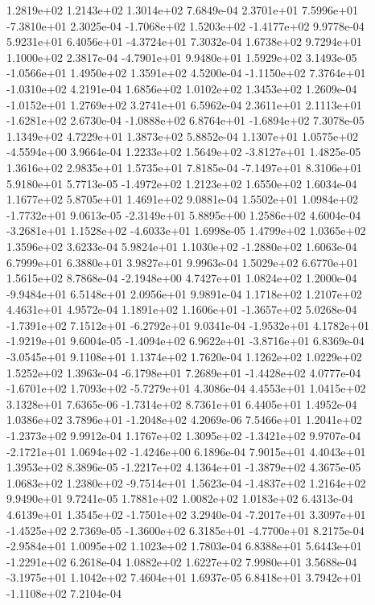1.2819e+02 1.2143e+02 1.3014e+02  7.6849e-04
 2.3701e+01  7.5996e+01 -7.3810e+01  2.3025e-04
-1.7068e+02  1.5203e+02 -1.4177e+02  9.9778e-04
 5.9231e+01  6.4056e+01 -4.3724e+01  7.3032e-04
1.6738e+02 9.7294e+01 1.1000e+02  2.3817e-04
-4.7901e+01  9.9480e+01  1.5929e+02  3.1493e-05
-1.0566e+01  1.4950e+02  1.3591e+02  4.5200e-04
-1.1150e+02  7.3764e+01 -1.0310e+02  4.2191e-04
1.6856e+02 1.0102e+02 1.3453e+02  1.2609e-04
-1.0152e+01  1.2769e+02  3.2741e+01  6.5962e-04
 2.3611e+01  2.1113e+01 -1.6281e+02  2.6730e-04
-1.0888e+02  6.8764e+01 -1.6894e+02  7.3078e-05
1.1349e+02 4.7229e+01 1.3873e+02  5.8852e-04
 1.1307e+01  1.0575e+02 -4.5594e+00  3.9664e-04
 1.2233e+02  1.5649e+02 -3.8127e+01  1.4825e-05
1.3616e+02 2.9835e+01 1.5735e+01  7.8185e-04
-7.1497e+01  8.3106e+01  5.9180e+01  5.7713e-05
-1.4972e+02  1.2123e+02  1.6550e+02  1.6034e-04
1.1677e+02 5.8705e+01 1.4691e+02  9.0881e-04
 1.5502e+01  1.0984e+02 -1.7732e+01  9.0613e-05
-2.3149e+01  5.8895e+00  1.2586e+02  4.6004e-04
-3.2681e+01  1.1528e+02 -4.6033e+01  1.6998e-05
1.4799e+02 1.0365e+02 1.3596e+02  3.6233e-04
 5.9824e+01  1.1030e+02 -1.2880e+02  1.6063e-04
6.7999e+01 6.3880e+01 3.9827e+01  9.9963e-04
1.5029e+02 6.6770e+01 1.5615e+02  8.7868e-04
-2.1948e+00  4.7427e+01  1.0824e+02  1.2000e-04
-9.9484e+01  6.5148e+01  2.0956e+01  9.9891e-04
1.1718e+02 1.2107e+02 4.4631e+01  4.9572e-04
 1.1891e+02  1.1606e+01 -1.3657e+02  5.0268e-04
-1.7391e+02  7.1512e+01 -6.2792e+01  9.0341e-04
-1.9532e+01  4.1782e+01 -1.9219e+01  9.6004e-05
-1.4094e+02  6.9622e+01 -3.8716e+01  6.8369e-04
-3.0545e+01  9.1108e+01  1.1374e+02  1.7620e-04
1.1262e+02 1.0229e+02 1.5252e+02  1.3963e-04
-6.1798e+01  7.2689e+01 -1.4428e+02  4.0777e-04
-1.6701e+02  1.7093e+02 -5.7279e+01  4.3086e-04
4.4553e+01 1.0415e+02 3.1328e+01  7.6365e-06
-1.7314e+02  8.7361e+01  6.4405e+01  1.4952e-04
 1.0386e+02  3.7896e+01 -1.2048e+02  4.2069e-06
 7.5466e+01  1.2041e+02 -1.2373e+02  9.9912e-04
 1.1767e+02  1.3095e+02 -1.3421e+02  9.9707e-04
-2.1721e+01  1.0694e+02 -1.4246e+00  6.1896e-04
7.9015e+01 4.4043e+01 1.3953e+02  8.3896e-05
-1.2217e+02  4.1364e+01 -1.3879e+02  4.3675e-05
 1.0683e+02  1.2380e+02 -9.7514e+01  1.5623e-04
-1.4837e+02  1.2164e+02  9.9490e+01  9.7241e-05
1.7881e+02 1.0082e+02 1.0183e+02  6.4313e-04
 4.6139e+01  1.3545e+02 -1.7501e+02  3.2940e-04
-7.2017e+01  3.3097e+01 -1.4525e+02  2.7369e-05
-1.3600e+02  6.3185e+01 -4.7700e+01  8.2175e-04
-2.9584e+01  1.0095e+02  1.1023e+02  1.7803e-04
 6.8388e+01  5.6443e+01 -1.2291e+02  6.2618e-04
1.0882e+02 1.6227e+02 7.9980e+01  3.5688e-04
-3.1975e+01  1.1042e+02  7.4604e+01  1.6937e-05
 6.8418e+01  3.7942e+01 -1.1108e+02  7.2104e-04

